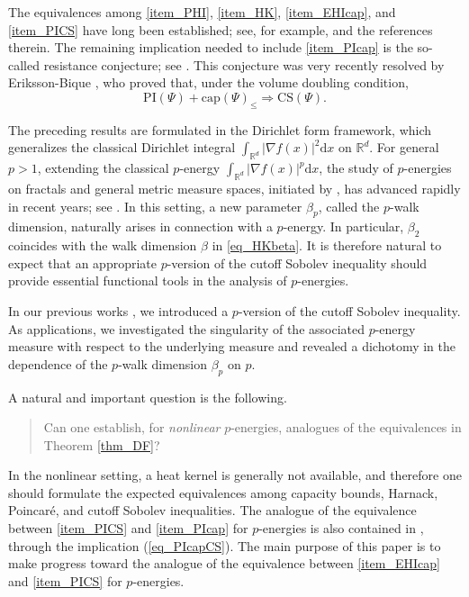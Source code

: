 \documentclass[11pt,a4paper]{article}
\numberwithin{equation}{section}
\theoremstyle{plain}
\theoremstyle{definition}
\begin{document}
The equivalences among \ref{item_PHI}, \ref{item_HK}, \ref{item_EHIcap}, and \ref{item_PICS} have long been established; see, for example, \cite{BBK06,GT12,GH14,AB15,GHL15} and the references therein. The remaining implication needed to include \ref{item_PIcap} is the so-called resistance conjecture; see \cite{Bar13, GHL14, Gri22}. This conjecture was very recently resolved by Eriksson-Bique \cite{Eri26}, who proved that, under the volume doubling condition,
\begin{equation}\label{eq_PIcapCS}
\text{PI}(\Psi)+\text{cap}(\Psi)_{\le}\Rightarrow \text{CS}(\Psi).
\end{equation}

The preceding results are formulated in the Dirichlet form framework, which generalizes the classical Dirichlet integral $\int_{\mathbb{R}^{d}}|\nabla f(x)|^{2}\mathrm{d}x$ on $\mathbb{R}^{d}$. For general $p>1$, extending the classical $p$-energy $\int_{\mathbb{R}^{d}}|\nabla f(x)|^{p}\mathrm{d}x$, the study of $p$-energies on fractals and general metric measure spaces, initiated by \cite{HPS04}, has advanced rapidly in recent years; see \cite{CGQ22,Shi24,BC23,MS25,Kig23,CGYZ26,AB25,AES25a}. In this setting, a new parameter $\beta_{p}$, called the $p$-walk dimension, naturally arises in connection with a $p$-energy. In particular, $\beta_{2}$ coincides with the walk dimension $\beta$ in \ref{eq_HKbeta}. It is therefore natural to expect that an appropriate $p$-version of the cutoff Sobolev inequality should provide essential functional tools in the analysis of $p$-energies.

In our previous works \cite{Yan25a,Yan25c,Yan25e}, we introduced a $p$-version of the cutoff Sobolev inequality. As applications, we investigated the singularity of the associated $p$-energy measure with respect to the underlying measure and revealed a dichotomy in the dependence of the $p$-walk dimension $\beta_{p}$ on $p$.

A natural and important question is the following.

\begin{quote}
Can one establish, for \emph{nonlinear} $p$-energies, analogues of the equivalences in Theorem \ref{thm_DF}?
\end{quote}

In the nonlinear setting, a heat kernel is generally not available, and therefore one should formulate the expected equivalences among capacity bounds, Harnack, Poincar\'e, and cutoff Sobolev inequalities. The analogue of the equivalence between \ref{item_PICS} and \ref{item_PIcap} for $p$-energies is also contained in \cite{Eri26}, through the implication (\ref{eq_PIcapCS}). The main purpose of this paper is to make progress toward the analogue of the equivalence between \ref{item_EHIcap} and \ref{item_PICS} for $p$-energies.
\end{document}
